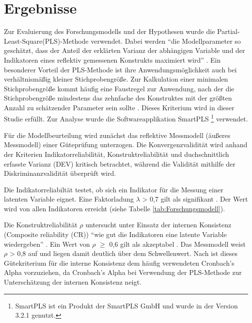\section{Ergebnisse}
\label{sec:ergebnisse}
\nocite{lohmoller2013latent}
Zur Evaluierung des Forschungsmodells und der Hypothesen wurde die Partial-Least-Square(PLS)-Methode verwendet. Dabei werden "`die Modellparameter so geschätzt, dass der Anteil der erklärten Varianz der abhängigen Variable und der Indikatoren eines reflektiv gemessenen Konstrukts maximiert wird"' \parencite[S.16]{nitzl2010anwenderorientierte}. Ein besonderer Vorteil der PLS-Methode ist ihre Anwendungsmöglichkeit auch bei verhältnismäßig kleiner Stichprobengröße. Zur Kalkulation einer minimalen Stichprobengröße kommt häufig eine Faustregel zur Anwendung, nach der die Stichprobengröße mindestens das zehnfache des Konstruktes mit der größten Anzahl zu schätzender Parameter sein sollte \parencite[vgl.][S.394]{islam2013investigating}. Dieses Kriterium wird in dieser Studie erfüllt. Zur Analyse wurde die Softwareapplikation SmartPLS \footnote{SmartPLS ist ein Produkt der SmartPLS GmbH und wurde in der Version 3.2.1 genutzt.} verwendet. 

Für die Modellbeurteilung wird zunächst das reflektive Messmodell (äußeres Messmodell) einer Güteprüfung unterzogen. Die Konvergenzvalidität wird anhand der Kriterien Indikatorreliabilität, Konstruktreliabilität und duchschnittlich erfasste Varianz (DEV) kritisch betrachtet, während die Validität mithilfe der Diskriminanzvalidität überprüft wird.

Die Indikatorreliabiltät testet, ob sich ein Indikator für die Messung einer latenten Variable eignet. Eine Faktorladung $\lambda$ > 0,7 gilt als signifikant \parencite[vgl.][S.24]{nitzl2010anwenderorientierte}. Der Wert wird von allen Indikatoren erreicht (siehe Tabelle \ref{tab:Forschungsmodell}). 

Die Konstruktreliabilität $\rho$ untersucht unter Einsatz der internen Konsistenz (Composite reliability (CR)) "`wie gut die Indikatoren eine latente Variable wiedergeben"' \parencite[S.25]{nitzl2010anwenderorientierte}. Ein Wert von $\rho$ $\geq$ 0,6 gilt als akzeptabel \parencite[vgl.][S.212]{ringle2007beurteilung}. Das Messmodell weist $\rho$ > 0,8 auf und liegen damit deutlich über dem Schwellenwert. Nach \textcite[S.320]{chin1998partial} ist dieses Gütekriterium für die interne Konsistenz dem häufig verwendeten Cronbach's Alpha vorzuziehen, da  Cronbach's Alpha bei Verwendung der PLS-Methode zur Unterschätzung der internen Konsistenz neigt.     

